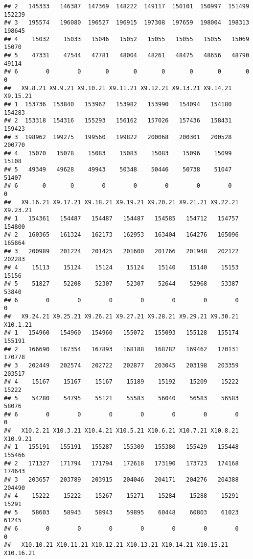\documentclass[
]{article}
\begin{document}
\begin{verbatim}
## 2   145333   146387  147369  148222  149117  150101  150997  151499  152239
## 3   195574   196080  196527  196915  197308  197659  198004  198313  198645
## 4    15032    15033   15046   15052   15055   15055   15055   15069   15070
## 5    47331    47544   47781   48004   48261   48475   48656   48790   49114
## 6        0        0       0       0       0       0       0       0       0
##   X9.8.21 X9.9.21 X9.10.21 X9.11.21 X9.12.21 X9.13.21 X9.14.21 X9.15.21
## 1  153736  153840   153962   153982   153990   154094   154180   154283
## 2  153318  154316   155293   156162   157026   157436   158431   159423
## 3  198962  199275   199560   199822   200068   200301   200528   200770
## 4   15070   15078    15083    15083    15083    15096    15099    15108
## 5   49349   49628    49943    50348    50446    50738    51047    51407
## 6       0       0        0        0        0        0        0        0
##   X9.16.21 X9.17.21 X9.18.21 X9.19.21 X9.20.21 X9.21.21 X9.22.21 X9.23.21
## 1   154361   154487   154487   154487   154585   154712   154757   154800
## 2   160365   161324   162173   162953   163404   164276   165096   165864
## 3   200989   201224   201425   201600   201766   201948   202122   202283
## 4    15113    15124    15124    15124    15140    15140    15153    15156
## 5    51827    52208    52307    52307    52644    52968    53387    53840
## 6        0        0        0        0        0        0        0        0
##   X9.24.21 X9.25.21 X9.26.21 X9.27.21 X9.28.21 X9.29.21 X9.30.21 X10.1.21
## 1   154960   154960   154960   155072   155093   155128   155174   155191
## 2   166690   167354   167893   168188   168782   169462   170131   170778
## 3   202449   202574   202722   202877   203045   203198   203359   203517
## 4    15167    15167    15167    15189    15192    15209    15222    15222
## 5    54280    54795    55121    55583    56040    56583    56583    58076
## 6        0        0        0        0        0        0        0        0
##   X10.2.21 X10.3.21 X10.4.21 X10.5.21 X10.6.21 X10.7.21 X10.8.21 X10.9.21
## 1   155191   155191   155287   155309   155380   155429   155448   155466
## 2   171327   171794   171794   172618   173190   173723   174168   174643
## 3   203657   203789   203915   204046   204171   204276   204388   204490
## 4    15222    15222    15267    15271    15284    15288    15291    15291
## 5    58603    58943    58943    59895    60448    60803    61023    61245
## 6        0        0        0        0        0        0        0        0
##   X10.10.21 X10.11.21 X10.12.21 X10.13.21 X10.14.21 X10.15.21 X10.16.21

\end{verbatim}
\end{document}
